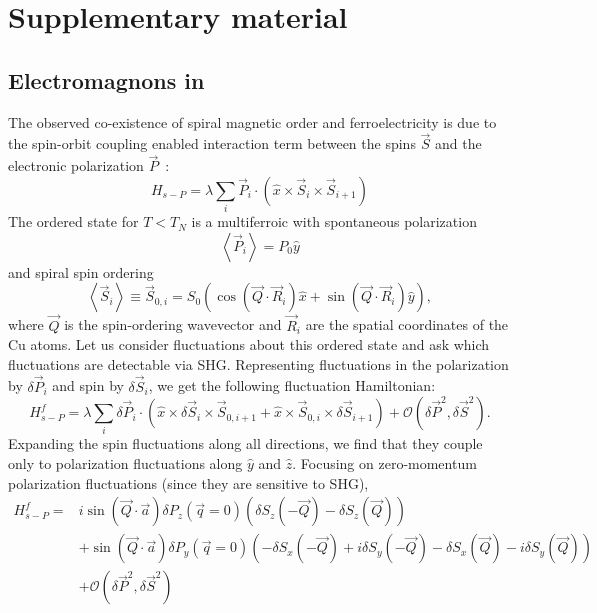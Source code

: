 \section{Supplementary material}

\subsection{Electromagnons in }\label{cubr2-sup:pimpliess}
The observed co-existence of spiral magnetic order and ferroelectricity is due to the spin-orbit coupling enabled interaction term between the spins $\vec S$ and the electronic polarization $\vec P$~\cite{katsura_dynamical_2007}:
\begin{equation}
    H_{s-P} = \lambda \sum_i \vec P_i \cdot (\hat x \times \vec S_i \times \vec S_{i+1})
\end{equation}
The ordered state for $T<T_N$ is a multiferroic with spontaneous polarization
\begin{equation}
\left<\vec P_i\right> = P_0 \hat y
\end{equation}
and spiral spin ordering
\begin{equation}
\left< \vec S_i\right> \equiv \vec S_{0,i} = S_0 \left( \cos (\vec Q \cdot \vec R_i) \hat x + \sin (\vec Q \cdot \vec R_i) \hat y\right),
\end{equation}
where $\vec Q$ is the spin-ordering wavevector and $\vec R_i$ are the spatial coordinates of the Cu atoms.
Let us consider fluctuations about this ordered state and ask which fluctuations are detectable via SHG.
Representing fluctuations in the polarization by $\delta \vec P_i$ and spin by $\delta \vec S_i$, we get the following fluctuation Hamiltonian:
\begin{equation}\label{cubr2-eq:fluctuationhamiltonian}
    H^f_{s-P} = \lambda \sum_i \delta \vec P_i \cdot (\hat x \times \delta \vec S_i \times \vec S_{0,i+1} + \hat x \times \vec S_{0,i} \times \delta \vec S_{i+1}) + \mathcal{O}(\delta \vec P^2, \delta \vec S^2).
\end{equation}
Expanding the spin fluctuations along all directions, we find that they couple only to polarization fluctuations along $\hat y$ and $\hat z$.
Focusing on zero-momentum polarization fluctuations (since they are sensitive to SHG),
\begin{equation}\label{cubr2-eq:ftfluctuationhamiltonian}
\begin{aligned}
H^f_{s-P} = &i \sin (\vec Q \cdot \vec a) \delta P_z(\vec q=0) \left(\delta S_z(-\vec Q) - \delta S_z (\vec Q) \right)\\
&+\sin (\vec Q \cdot \vec a) \delta P_y(\vec q=0) \left( -\delta S_x(-\vec Q) + i\delta S_y(-\vec Q) - \delta S_x(\vec Q) - i\delta S_y(\vec Q) \right)\\
& + \mathcal{O}(\delta \vec P^2, \delta \vec S^2)
\end{aligned}
\end{equation}
